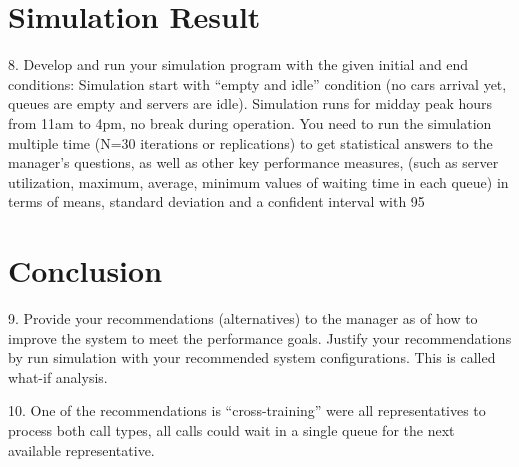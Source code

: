 \documentclass{article}
\begin{document}
\section{Simulation Result}
8. Develop and run your simulation program with the given initial and end conditions:  Simulation start with “empty and idle” condition (no cars arrival yet, queues are empty and servers are idle).  Simulation runs for midday peak hours from 11am to 4pm, no break during operation.  You need to run the simulation multiple time (N=30 iterations or replications) to get statistical answers to the manager’s questions, as well as other key performance measures, (such as server utilization, maximum, average, minimum values of waiting time in each queue) in terms of means, standard deviation and a confident interval with 95%


\section{Conclusion}
9. Provide your recommendations (alternatives) to the manager as of how to improve the system to meet the performance goals. Justify your recommendations by run simulation with your recommended system configurations. This is called what-if analysis. \\
\par

10. One of the recommendations is “cross-training” were all representatives to process both call types, all calls could wait in a single queue for the next available representative. 
\end{document}
